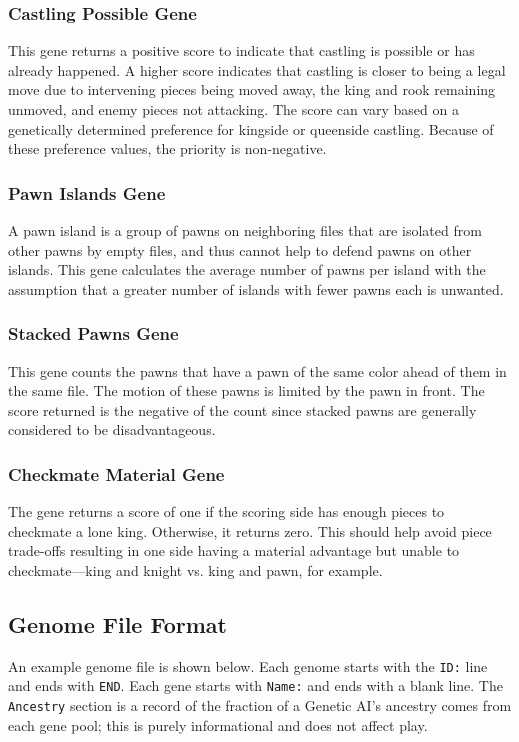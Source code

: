\documentclass[letterpaper]{article}
\renewcommand{\_}{\allowbreak\textunderscore\allowbreak}
\begin{document}
\subsubsection{Castling Possible Gene}
This gene returns a positive score to indicate that castling is possible or has already happened. A higher score indicates that castling is closer to being a legal move due to intervening pieces being moved away, the king and rook remaining unmoved, and enemy pieces not attacking. The score can vary based on a genetically determined preference for kingside or queenside castling. Because of these preference values, the priority is non-negative.

\subsubsection{Pawn Islands Gene}
A pawn island is a group of pawns on neighboring files that are isolated from other pawns by empty files, and thus cannot help to defend pawns on other islands. This gene calculates the average number of pawns per island with the assumption that a greater number of islands with fewer pawns each is unwanted.

\subsubsection{Stacked Pawns Gene}
This gene counts the pawns that have a pawn of the same color ahead of them in the same file. The motion of these pawns is limited by the pawn in front. The score returned is the negative of the count since stacked pawns are generally considered to be disadvantageous.

\subsubsection{Checkmate Material Gene}
The gene returns a score of one if the scoring side has enough pieces to checkmate a lone king. Otherwise, it returns zero. This should help avoid piece trade-offs resulting in one side having a material advantage but unable to checkmate---king and knight vs\@. king and pawn, for example.


\subsection{Genome File Format}
An example genome file is shown below. Each genome starts with the \verb|ID:| line and ends with \verb|END|. Each gene starts with \verb|Name:| and ends with a blank line. The \verb|Ancestry| section is a record of the fraction of a Genetic AI's ancestry comes from each gene pool; this is purely informational and does not affect play.
\setlength{\columnseprule}{.11pt}
\def\columnseprulecolor{\color{black}}
\begin{multicols}{2}

\end{multicols}
\end{document}
